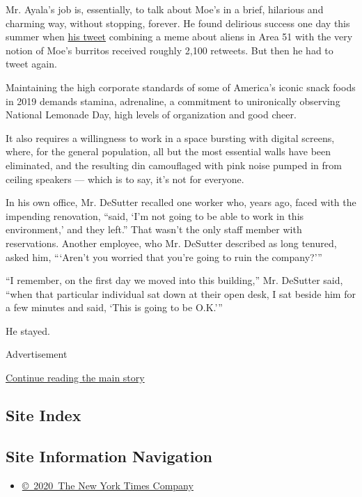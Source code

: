 Mr. Ayala's job is, essentially, to talk about Moe's in a brief,
hilarious and charming way, without stopping, forever. He found
delirious success one day this summer when
\href{https://twitter.com/Moes_HQ/status/1150800074835972096}{his tweet}
combining a meme about aliens in Area 51 with the very notion of Moe's
burritos received roughly 2,100 retweets. But then he had to tweet
again.

Maintaining the high corporate standards of some of America's iconic
snack foods in 2019 demands stamina, adrenaline, a commitment to
unironically observing National Lemonade Day, high levels of
organization and good cheer.

It also requires a willingness to work in a space bursting with digital
screens, where, for the general population, all but the most essential
walls have been eliminated, and the resulting din camouflaged with pink
noise pumped in from ceiling speakers --- which is to say, it's not for
everyone.

In his own office, Mr. DeSutter recalled one worker who, years ago,
faced with the impending renovation, ``said, `I'm not going to be able
to work in this environment,' and they left.'' That wasn't the only
staff member with reservations. Another employee, who Mr. DeSutter
described as long tenured, asked him, ```Aren't you worried that you're
going to ruin the company?'''

``I remember, on the first day we moved into this building,'' Mr.
DeSutter said, ``when that particular individual sat down at their open
desk, I sat beside him for a few minutes and said, `This is going to be
O.K.'''

He stayed.

Advertisement

\protect\hyperlink{after-bottom}{Continue reading the main story}

\hypertarget{site-index}{%
\subsection{Site Index}\label{site-index}}

\hypertarget{site-information-navigation}{%
\subsection{Site Information
Navigation}\label{site-information-navigation}}

\begin{itemize}
\tightlist
\item
  \href{https://help.nytimes.com/hc/en-us/articles/115014792127-Copyright-notice}{©~2020~The
  New York Times Company}
\end{itemize}


